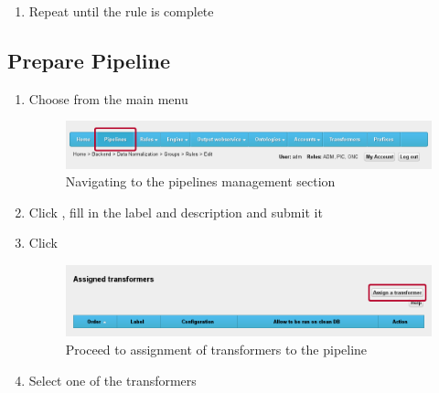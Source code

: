 {\begin{enumerate}[resume]
\vspace*{0.2\textheight}

	\item Repeat until the rule is complete
\end{enumerate}

\newpage  
\subsection*{Prepare Pipeline}
\begin{enumerate}[resume]

\vspace*{0.2\textheight}

	\item Choose  from the main menu

\begin{figure}[!ht]
    \centering
    \includegraphics[width=\textwidth]{images/fe-walkthrough-menu-pipelines.png}
    \caption{Navigating to the pipelines management section}
	\label{fig:feWTMenuPipelines}
\end{figure}
\FloatBarrier

\vspace*{0.2\textheight}

	\item Click , fill in the label and description and submit it

	\item Click 

\begin{figure}[!ht]
    \centering
    \includegraphics[width=\textwidth]{images/fe-walkthrough-assign-transformer.png}
    \caption{Proceed to assignment of transformers to the pipeline}
	\label{fig:feWTAssignTransformer}
\end{figure}
\FloatBarrier

\vspace*{0.2\textheight}

	\item Select one of the transformers
	

\end{enumerate}}
